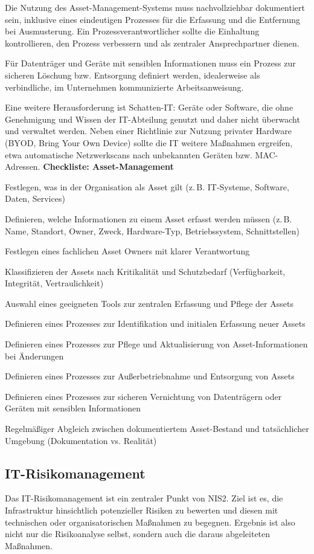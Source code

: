 Die Nutzung des Asset-Management-Systems muss nachvollziehbar dokumentiert sein, inklusive eines eindeutigen Prozesses für die Erfassung und die Entfernung bei Ausmusterung. Ein Prozessverantwortlicher sollte die Einhaltung kontrollieren, den Prozess verbessern und als zentraler Ansprechpartner dienen.

Für Datenträger und Geräte mit sensiblen Informationen muss ein Prozess zur sicheren Löschung bzw. Entsorgung definiert werden, idealerweise als verbindliche, im Unternehmen kommunizierte Arbeitsanweisung.

Eine weitere Herausforderung ist Schatten-IT: Geräte oder Software, die ohne Genehmigung und Wissen der IT-Abteilung genutzt und daher nicht überwacht und verwaltet werden. Neben einer Richtlinie zur Nutzung privater Hardware (BYOD, Bring Your Own Device) sollte die IT weitere Maßnahmen ergreifen, etwa automatische Netzwerkscans nach unbekannten Geräten bzw. MAC-Adressen.
\newpage
\textbf{Checkliste: Asset-Management}
\begin{checklist}
  \item Festlegen, was in der Organisation als Asset gilt (z.\,B. IT-Systeme, Software, Daten, Services)
  \item Definieren, welche Informationen zu einem Asset erfasst werden müssen (z.\,B. Name, Standort, Owner, Zweck, Hardware-Typ, Betriebssystem, Schnittstellen)
  \item Festlegen eines fachlichen Asset Owners mit klarer Verantwortung
  \item Klassifizieren der Assets nach Kritikalität und Schutzbedarf (Verfügbarkeit, Integrität, Vertraulichkeit)
  \item Auswahl eines geeigneten Tools zur zentralen Erfassung und Pflege der Assets
  \item Definieren eines Prozesses zur Identifikation und initialen Erfassung neuer Assets
  \item Definieren eines Prozesses zur Pflege und Aktualisierung von Asset-Informationen bei Änderungen
  \item Definieren eines Prozesses zur Außerbetriebnahme und Entsorgung von Assets
  \item Definieren eines Prozesses zur sicheren Vernichtung von Datenträgern oder Geräten mit sensiblen Informationen
  \item Regelmäßiger Abgleich zwischen dokumentiertem Asset-Bestand und tatsächlicher Umgebung (Dokumentation vs. Realität)
\end{checklist}
\newpage
\subsection{IT-Risikomanagement}
Das IT-Risikomanagement ist ein zentraler Punkt von NIS2. Ziel ist es, die Infrastruktur hinsichtlich potenzieller Risiken zu bewerten und diesen mit technischen oder organisatorischen Maßnahmen zu begegnen. Ergebnis ist also nicht nur die Risikoanalyse selbst, sondern auch die daraus abgeleiteten Maßnahmen.

